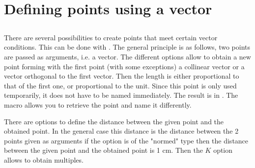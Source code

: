 \section{Defining points using a vector}

\subsection{}
There are several possibilities to create points that meet certain vector conditions.
This can be done with . The general principle is as follows, two points are passed as arguments, i.e. a vector. The different options allow to obtain a new point forming with the first point (with some exceptions) a collinear vector or a vector orthogonal to the first vector. Then the length is either proportional to that of the first one, or proportional to the unit. Since this point is only used temporarily, it does not have to be named immediately. The result is in . The macro  allows you to retrieve the point and name it differently.

 There are options to define the distance between the given point and the obtained point.
In the general case this distance is the distance between the 2 points given as arguments if the option is of the "normed" type then the distance between the given point and the obtained point is 1 cm. Then the $K$ option allows to obtain multiples.

